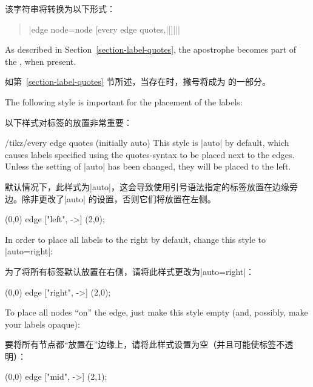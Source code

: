 该字符串将转换为以下形式：

\begin{quote}
    |edge node=node [every edge quotes,||]{||}|
\end{quote}
%
As described in Section~\ref{section-label-quotes}, the apostrophe becomes part
of the , when present.

如第~\ref{section-label-quotes} 节所述，当存在时，撇号将成为  的一部分。

The following style is important for the placement of the labels:

以下样式对标签的放置非常重要：

\begin{stylekey}{/tikz/every edge quotes (initially auto)}
    This style is |auto| by default, which causes labels specified using the
    quotes-syntax to be placed next to the edges. Unless the setting of |auto|
    has been changed, they will be placed to the left.
    
    默认情况下，此样式为|auto|，这会导致使用引号语法指定的标签放置在边缘旁边。除非更改了|auto| 的设置，否则它们将放置在左侧。

\begin{codeexample}[preamble={\usetikzlibrary{quotes}}]
\tikz \draw (0,0) edge ["left", ->] (2,0);
\end{codeexample}

    In order to place all labels to the right by default, change this style to
    |auto=right|:
    
    为了将所有标签默认放置在右侧，请将此样式更改为|auto=right|：

\begin{codeexample}[preamble={\usetikzlibrary{quotes}}]
\tikz [every edge quotes/.style={auto=right}]
  \draw (0,0) edge ["right", ->] (2,0);
\end{codeexample}

    To place all nodes ``on'' the edge, just make this style empty (and,
    possibly, make your labels opaque):
    
    要将所有节点都“放置在”边缘上，请将此样式设置为空（并且可能使标签不透明）：

\begin{codeexample}[preamble={\usetikzlibrary{quotes}}]
\tikz [every edge quotes/.style={fill=white,font=\footnotesize}]
  \draw (0,0) edge ["mid", ->] (2,1);
\end{codeexample}
\end{stylekey}

